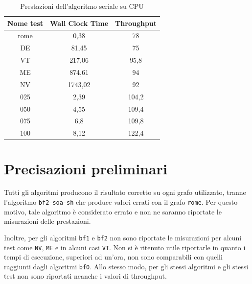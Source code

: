 \documentclass[12pt,a4paper,oneside]{book}
\begin{document}
	\begin{table}[!ht]
		\centering
		\begin{tabular}{|c|c|c|}
			\hline
			\textbf{Nome test} & \textbf{Wall Clock Time} & \textbf{Throughput} \\ \hline
			       rome        &           0,38           &         78          \\ \hline
			        DE         &          81,45           &         75          \\ \hline
			        VT         &          217,06          &        95,8         \\ \hline
			        ME         &          874,61          &         94          \\ \hline
			        NV         &         1743,02          &         92          \\ \hline
			       025         &           2,39           &        104,2        \\ \hline
			       050         &           4,55           &        109,4        \\ \hline
			       075         &           6,8            &        109,8        \\ \hline
			       100         &           8,12           &        122,4        \\ \hline
		\end{tabular}
		\caption{Prestazioni dell'algoritmo seriale su CPU}
		\label{tab:performance_serial}
	\end{table}

	\section{Precisazioni preliminari}
	Tutti gli algoritmi producono il risultato corretto su ogni grafo utilizzato, tranne l'algoritmo \texttt{bf2-soa-sh} che produce valori errati con il grafo \texttt{rome}. Per questo motivo, tale algoritmo è considerato errato e non ne saranno riportate le misurazioni delle prestazioni.
	
	Inoltre, per gli algoritmi \texttt{bf1} e \texttt{bf2} non sono riportate le misurazioni per alcuni test come \texttt{NV}, \texttt{ME} e in alcuni casi \texttt{VT}. Non si è ritenuto utile riportarle in quanto i tempi di esecuzione, superiori ad un'ora, non sono comparabili con quelli raggiunti dagli algoritmi \texttt{bf0}. Allo stesso modo, per gli stessi algoritmi e gli stessi test non sono riportati neanche i valori di throughput.
	
\end{document}

